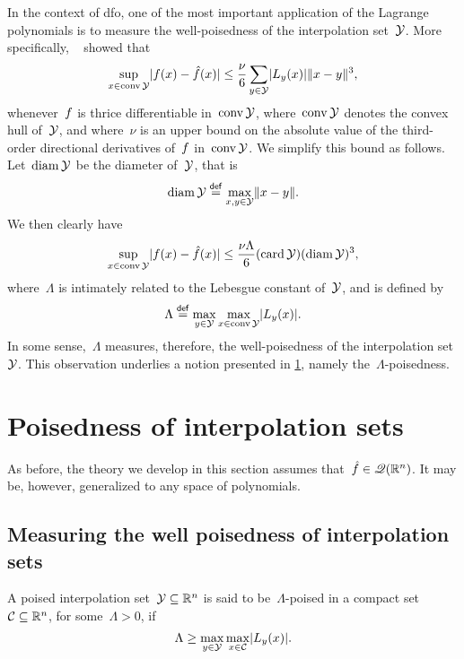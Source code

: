 In the context of \gls{dfo}, one of the most important application of the Lagrange polynomials is to measure the well-poisedness of the interpolation set~$\xpt$.
More specifically, \citeauthor{Ciarlet_Raviart_1972}~\cite{Ciarlet_Raviart_1972} showed that
\begin{equation}
    \label{eq:Ciarlet_Raviart_0}
    \sup_{x \in \conv \xpt} \abs{\obj(x) - \objm(x)} \le \frac{\nu}{6} \sum_{y \in \xpt} \abs{\lagp[y](x)} \norm{x - y}^3,
\end{equation}
whenever~$f$ is thrice differentiable in~$\conv \xpt$, where~$\conv \xpt$ denotes the convex hull of~$\xpt$, and where~$\nu$ is an upper bound on the absolute value of the third-order directional derivatives of~$f$ in~$\conv \xpt$.
We simplify this bound as follows.
Let~$\diam \xpt$ be the diameter of~$\xpt$, that is
\begin{equation*}
    \diam \xpt \eqdef \max_{x, y \in \xpt} \norm{x - y}.
\end{equation*}
We then clearly have
\begin{equation*}
    \sup_{x \in \conv \xpt} \abs{\obj(x) - \objm(x)} \le \frac{\nu \Lambda}{6} (\card \xpt) (\diam\xpt)^3,
\end{equation*}
where~$\Lambda$ is intimately related to the Lebesgue constant of~$\xpt$, and is defined by
\begin{equation}
    \label{eq:lambda-poisedness-convex-hull}
    \Lambda \eqdef \max_{y \in \xpt} \max_{x \in \conv \xpt} \abs{\lagp[y](x)}.
\end{equation}
In some sense,~$\Lambda$ measures, therefore, the well-poisedness of the interpolation set~$\xpt$.
This observation underlies a notion presented in \cref{sec:poisedness}, namely the~$\Lambda$-poisedness.

\section{Poisedness of interpolation sets}
\label{sec:poisedness}

As before, the theory we develop in this section assumes that~$\objm \in \qpoly$.
It may be, however, generalized to any space of polynomials.

\subsection{Measuring the well poisedness of interpolation sets}

\begin{definition}
    A poised interpolation set~$\xpt \subseteq \R^n$ is said to be~$\Lambda$-poised in a compact set~$\mathcal{C} \subseteq \mathbb{R}^n$, for some~$\Lambda > 0$, if
    \begin{equation*}
        \Lambda \ge \max_{y \in \xpt} \max_{x \in \mathcal{C}} \abs{\lagp[y](x)}.
    \end{equation*}
\end{definition}

